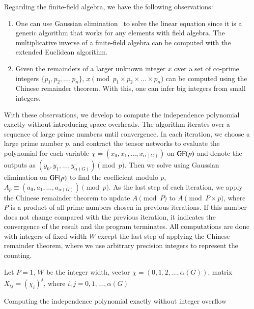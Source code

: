 \documentclass[review, onefignum, onetabnum]{siamart190516}
\begin{document}
Regarding the finite-field algebra, we have the following observations:
\begin{enumerate}
    \item One can use Gaussian elimination~\cite{Golub2013} to solve the linear equation  since it is a generic algorithm that works for any elements with field algebra. The multiplicative inverse of a finite-field algebra can be computed with the extended Euclidean algorithm.
    \item Given the remainders of a larger unknown integer $x$ over a set of co-prime integers $\{p_1, p_2, \ldots, p_n\}$,
    $x \pmod {p_1 \times p_2 \times \ldots \times p_n}$ can be computed using the Chinese remainder theorem. With this, one can infer big integers from small integers.
\end{enumerate}
With these observations, we develop  to compute the independence polynomial exactly without introducing space overheads.
The algorithm iterates over a sequence of large prime numbers until convergence.
In each iteration, we choose a large prime number $p$, and contract the tensor networks to evaluate the polynomial for each variable $\chi = (x_{0}, x_{1}, \ldots, x_{\alpha(G)})$ on ${\rm GF}(p)$ and denote the outputs as $(y_0, y_1, \ldots, y_{\alpha(G)}) \pmod p$.
Then we solve  using Gaussian elimination on ${\rm GF}(p)$ to find the coefficient modulo $p$, $A_p \equiv (a_0, a_1, \ldots, a_{\alpha(G)})\pmod p$.
As the last step of each iteration, we apply the Chinese remainder theorem to update $A \pmod P $ to $ A \pmod {P\times p}$, where $P$ is a product of all prime numbers chosen in previous iterations.
If this number does not change compared with the previous iteration, it indicates the convergence of the result and the program terminates.
All computations are done with integers of fixed-width $W$ except the last step of applying the Chinese remainder theorem, where we use arbitrary precision integers to represent the counting.

\LinesNumberedHidden
\begin{algorithm}[!ht]
    \small
    \SetAlgoNoLine
    Let $P = 1$, $W$ be the integer width, vector $\chi = (0,1,2, \ldots, \alpha(G))$, matrix $X_{ij} = (\chi_i)^j$, where $i,j = 0, 1, \ldots, \alpha(G)$\;

    \caption{Computing the independence polynomial exactly without integer overflow}\label{alg:finitefield} 
\end{algorithm}
\end{document}
